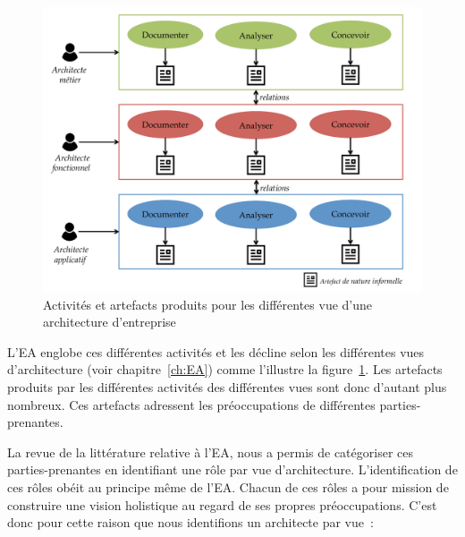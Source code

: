     \begin{figure}[!ht]
         \begin{center}
        \includegraphics[width=1\textwidth]{figures/4_demarche/pratique_courante_ea.pdf}
         \end{center}
         \caption{Activités et artefacts produits pour les différentes vue d'une architecture d'entreprise}
         \label{fig:limites_ea}
    \end{figure}

L'EA englobe ces différentes activités et les décline selon
les différentes vues d'architecture (voir chapitre~\ref{ch:EA}) comme
l'illustre la figure~\ref{fig:limites_ea}. Les artefacts produits par les différentes
activités des différentes vues sont donc d'autant plus nombreux. Ces artefacts
adressent les préoccupations de différentes parties-prenantes.

La revue de la littérature relative à l'EA, nous a permis de catégoriser ces
parties-prenantes en identifiant une rôle par vue d'architecture. L'identification
de ces rôles obéit au principe même de l'EA. Chacun de ces rôles a pour
mission de construire une vision holistique au regard de ses propres
préoccupations. C'est
donc pour cette raison que nous identifions un architecte par vue~:

